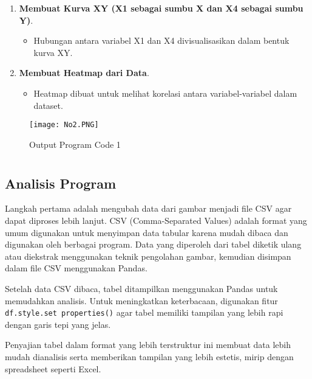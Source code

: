 \documentclass[
  course = {{Data Visualisasi dan Pemrosesan Citra}},
  assignment = 2,
  name = {{Dosen Pengampu Matkul 1 ; Dosen Pengampu Matkul 2}},
  studentnumber = {{ ; }},
  email = {{Prof. Dr. Suprijadi, M.Eng. ; Dr. Irfan Dwi Aditya, S.Si., M.Si.}},
  firstexercise = 1
]{aga-homework}
\begin{document}
\begin{enumerate}
    \item \textbf{Membuat Kurva XY (X1 sebagai sumbu X dan X4 sebagai sumbu Y)}.
    \begin{itemize}
        \item Hubungan antara variabel X1 dan X4 divisualisasikan dalam bentuk kurva XY.
    \end{itemize}
    
    \item \textbf{Membuat Heatmap dari Data}.
    \begin{itemize}
        \item Heatmap dibuat untuk melihat korelasi antara variabel-variabel dalam dataset.
    \end{itemize}
\end{enumerate}


\exercise

\nolinenumbers
    
\linenumbers

\begin{figure}[h!]
    \centering
    \texttt{[image: No2.PNG]}
    \caption{Output Program Code 1}
    \label{fig:enter-label}
\end{figure}
\section{}
\subsection{Analisis Program}
Langkah pertama adalah mengubah data dari gambar menjadi file CSV agar dapat diproses lebih lanjut. CSV (Comma-Separated Values) adalah format yang umum digunakan untuk menyimpan data tabular karena mudah dibaca dan digunakan oleh berbagai program. Data yang diperoleh dari tabel diketik ulang atau diekstrak menggunakan teknik pengolahan gambar, kemudian disimpan dalam file CSV menggunakan Pandas. 
\newline


Setelah data CSV dibaca, tabel ditampilkan menggunakan Pandas untuk memudahkan analisis. Untuk meningkatkan keterbacaan, digunakan fitur \texttt{df.style.set \textunderscore properties()} agar tabel memiliki tampilan yang lebih rapi dengan garis tepi yang jelas.  

Penyajian tabel dalam format yang lebih terstruktur ini membuat data lebih mudah dianalisis serta memberikan tampilan yang lebih estetis, mirip dengan spreadsheet seperti Excel.
\end{document}
